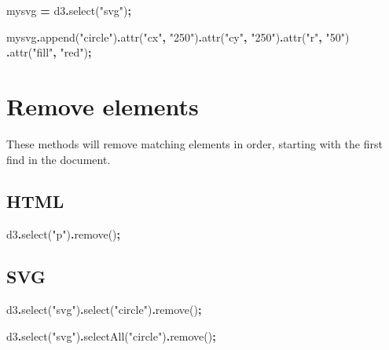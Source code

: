 \documentclass[
  openany]{book}
\newenvironment{Shaded}{\begin{snugshade}}{\end{snugshade}}
\newcommand{\FunctionTok}[1]{\textcolor[rgb]{0.00,0.00,0.00}{#1}}
\newcommand{\NormalTok}[1]{#1}
\newcommand{\OperatorTok}[1]{\textcolor[rgb]{0.81,0.36,0.00}{\textbf{#1}}}
\newcommand{\StringTok}[1]{\textcolor[rgb]{0.31,0.60,0.02}{#1}}
\begin{document}
\begin{Shaded}
\begin{Highlighting}[]
\NormalTok{mysvg }\OperatorTok{=}\NormalTok{ d3}\OperatorTok{.}\FunctionTok{select}\NormalTok{(}\StringTok{"svg"}\NormalTok{)}\OperatorTok{;}

\NormalTok{mysvg}\OperatorTok{.}\FunctionTok{append}\NormalTok{(}\StringTok{"circle"}\NormalTok{)}\OperatorTok{.}\FunctionTok{attr}\NormalTok{(}\StringTok{"cx"}\OperatorTok{,} \StringTok{"250"}\NormalTok{)}\OperatorTok{.}\FunctionTok{attr}\NormalTok{(}\StringTok{"cy"}\OperatorTok{,} \StringTok{"250"}\NormalTok{)}\OperatorTok{.}\FunctionTok{attr}\NormalTok{(}\StringTok{"r"}\OperatorTok{,} \StringTok{"50"}\NormalTok{)}
  \OperatorTok{.}\FunctionTok{attr}\NormalTok{(}\StringTok{"fill"}\OperatorTok{,} \StringTok{"red"}\NormalTok{)}\OperatorTok{;}
\end{Highlighting}
\end{Shaded}

\hypertarget{remove-elements}{%
\section{\texorpdfstring{Remove elements }{Remove elements }}\label{remove-elements}}

These methods will remove matching elements in order, starting with the first find in the document.

\hypertarget{html-2}{%
\subsection{HTML}\label{html-2}}

\begin{Shaded}
\begin{Highlighting}[]
\NormalTok{d3}\OperatorTok{.}\FunctionTok{select}\NormalTok{(}\StringTok{"p"}\NormalTok{)}\OperatorTok{.}\FunctionTok{remove}\NormalTok{()}\OperatorTok{;}
\end{Highlighting}
\end{Shaded}

\hypertarget{svg-2}{%
\subsection{SVG}\label{svg-2}}

\begin{Shaded}
\begin{Highlighting}[]
\NormalTok{d3}\OperatorTok{.}\FunctionTok{select}\NormalTok{(}\StringTok{"svg"}\NormalTok{)}\OperatorTok{.}\FunctionTok{select}\NormalTok{(}\StringTok{"circle"}\NormalTok{)}\OperatorTok{.}\FunctionTok{remove}\NormalTok{()}\OperatorTok{;}

\NormalTok{d3}\OperatorTok{.}\FunctionTok{select}\NormalTok{(}\StringTok{"svg"}\NormalTok{)}\OperatorTok{.}\FunctionTok{selectAll}\NormalTok{(}\StringTok{"circle"}\NormalTok{)}\OperatorTok{.}\FunctionTok{remove}\NormalTok{()}\OperatorTok{;}
\end{Highlighting}
\end{Shaded}
\end{document}
